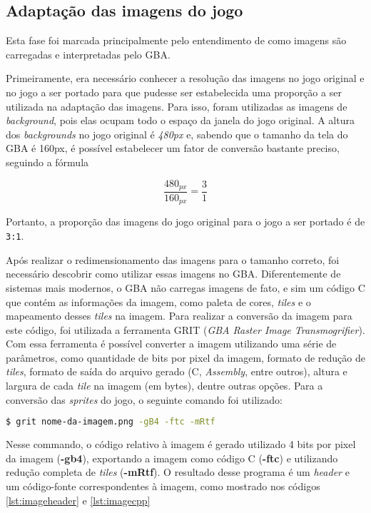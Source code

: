 \subsection{Adaptação das imagens do jogo}

Esta fase foi marcada principalmente pelo entendimento de como imagens são carregadas e interpretadas pelo GBA.

Primeiramente, era necessário conhecer a resolução das imagens no jogo original e no jogo a ser portado para que pudesse ser estabelecida uma proporção a ser utilizada na adaptação das imagens. Para isso, foram utilizadas as imagens de \textit{background}, pois elas ocupam todo o espaço da janela do jogo original. A altura dos \textit{backgrounds} no jogo original é \textit{480px} e, sabendo que o tamanho da tela do GBA é 160px, é possível estabelecer um fator de conversão bastante preciso, seguindo a fórmula

\begin{equation}
\label{Cálculo da proporção das imagens do jogo}
\frac{480_{px}}{160_{px}} = \frac{3}{1}
\end{equation}

Portanto, a proporção das imagens do jogo original para o jogo a ser portado é de \texttt{3:1}.

Após realizar o redimensionamento das imagens para o tamanho correto, foi necessário descobrir como utilizar essas imagens no GBA. Diferentemente de sistemas mais modernos, o GBA não carregas imagens de fato, e sim um código C que contém as informações da imagem, como paleta de cores, \textit{tiles} e o mapeamento desses \textit{tiles} na imagem. Para realizar a conversão da imagem para este código, foi utilizada a ferramenta GRIT (\textit{GBA Raster Image Transmogrifier}). Com essa ferramenta é possível converter a imagem utilizando uma série de parâmetros, como quantidade de bits por pixel da imagem, formato de redução de \textit{tiles}, formato de saída do arquivo gerado (C, \textit{Assembly}, entre outros), altura e largura de cada \textit{tile} na imagem (em bytes), dentre outras opções. Para a conversão das \textit{sprites} do jogo, o seguinte comando foi utilizado:

\begin{lstlisting}[language=bash,caption={Comando para conversão das imagens em código/}]
$ grit nome-da-imagem.png -gB4 -ftc -mRtf
\end{lstlisting}

Nesse commando, o código relativo à imagem é gerado utilizado 4 bits por pixel da imagem (\textbf{-gb4}), exportando a imagem como código C (\textbf{-ftc}) e utilizando redução completa de \textit{tiles} (\textbf{-mRtf}). O resultado desse programa é um \textit{header} e um código-fonte correspondentes à imagem, como mostrado nos códigos \ref{lst:imageheader} e \ref{lst:imagecpp}